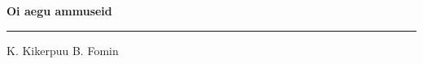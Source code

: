 \documentclass[10pt]{book}
\begin{document}
{
  \samepage
  \raggedbottom
  \raggedright
  \sloppy


  \vspace{0.2in}

  \noindent\begin{minipage}{.1\textwidth}
    \hfill\vspace{0.1in}
  \end{minipage}%
  \noindent\begin{minipage}{.8\textwidth}
    \centering
    \bfseries
    \large Oi aegu ammuseid
  \end{minipage}%
  \noindent\begin{minipage}{.1\textwidth}
      \hfill\vspace{0.1in}
  \end{minipage}

  \nopagebreak[4]
  \vspace{0.1in}
  \nopagebreak[4]
  \hrule height 0.05ex
  \nopagebreak[4]
  \vspace{-0.05in}

  {\footnotesize K. Kikerpuu \hfill B. Fomin }\\
  \vspace{0.01in}



}
\end{document}
